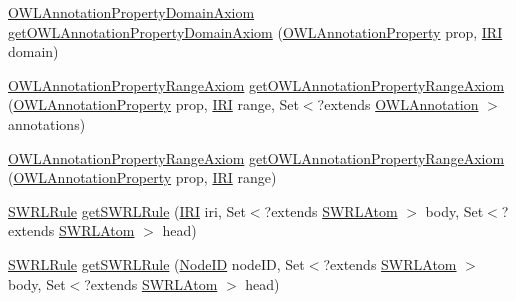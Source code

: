 \begin{DoxyCompactItemize}
\item 
\hyperlink{interfaceorg_1_1semanticweb_1_1owlapi_1_1model_1_1_o_w_l_annotation_property_domain_axiom}{O\-W\-L\-Annotation\-Property\-Domain\-Axiom} \hyperlink{classuk_1_1ac_1_1manchester_1_1cs_1_1owl_1_1owlapi_1_1_o_w_l_data_factory_impl_a42e56036485aa89a8f03d51d52663714}{get\-O\-W\-L\-Annotation\-Property\-Domain\-Axiom} (\hyperlink{interfaceorg_1_1semanticweb_1_1owlapi_1_1model_1_1_o_w_l_annotation_property}{O\-W\-L\-Annotation\-Property} prop, \hyperlink{classorg_1_1semanticweb_1_1owlapi_1_1model_1_1_i_r_i}{I\-R\-I} domain)
\item 
\hyperlink{interfaceorg_1_1semanticweb_1_1owlapi_1_1model_1_1_o_w_l_annotation_property_range_axiom}{O\-W\-L\-Annotation\-Property\-Range\-Axiom} \hyperlink{classuk_1_1ac_1_1manchester_1_1cs_1_1owl_1_1owlapi_1_1_o_w_l_data_factory_impl_a6e60beb4b0b4d50bc9dab99e5c59f611}{get\-O\-W\-L\-Annotation\-Property\-Range\-Axiom} (\hyperlink{interfaceorg_1_1semanticweb_1_1owlapi_1_1model_1_1_o_w_l_annotation_property}{O\-W\-L\-Annotation\-Property} prop, \hyperlink{classorg_1_1semanticweb_1_1owlapi_1_1model_1_1_i_r_i}{I\-R\-I} range, Set$<$?extends \hyperlink{interfaceorg_1_1semanticweb_1_1owlapi_1_1model_1_1_o_w_l_annotation}{O\-W\-L\-Annotation} $>$ annotations)
\item 
\hyperlink{interfaceorg_1_1semanticweb_1_1owlapi_1_1model_1_1_o_w_l_annotation_property_range_axiom}{O\-W\-L\-Annotation\-Property\-Range\-Axiom} \hyperlink{classuk_1_1ac_1_1manchester_1_1cs_1_1owl_1_1owlapi_1_1_o_w_l_data_factory_impl_a4371da7aa2710c6983bc51aeda62dab2}{get\-O\-W\-L\-Annotation\-Property\-Range\-Axiom} (\hyperlink{interfaceorg_1_1semanticweb_1_1owlapi_1_1model_1_1_o_w_l_annotation_property}{O\-W\-L\-Annotation\-Property} prop, \hyperlink{classorg_1_1semanticweb_1_1owlapi_1_1model_1_1_i_r_i}{I\-R\-I} range)
\item 
\hyperlink{interfaceorg_1_1semanticweb_1_1owlapi_1_1model_1_1_s_w_r_l_rule}{S\-W\-R\-L\-Rule} \hyperlink{classuk_1_1ac_1_1manchester_1_1cs_1_1owl_1_1owlapi_1_1_o_w_l_data_factory_impl_aabd296864fd7ff30d4425c1039f25e6c}{get\-S\-W\-R\-L\-Rule} (\hyperlink{classorg_1_1semanticweb_1_1owlapi_1_1model_1_1_i_r_i}{I\-R\-I} iri, Set$<$?extends \hyperlink{interfaceorg_1_1semanticweb_1_1owlapi_1_1model_1_1_s_w_r_l_atom}{S\-W\-R\-L\-Atom} $>$ body, Set$<$?extends \hyperlink{interfaceorg_1_1semanticweb_1_1owlapi_1_1model_1_1_s_w_r_l_atom}{S\-W\-R\-L\-Atom} $>$ head)
\item 
\hyperlink{interfaceorg_1_1semanticweb_1_1owlapi_1_1model_1_1_s_w_r_l_rule}{S\-W\-R\-L\-Rule} \hyperlink{classuk_1_1ac_1_1manchester_1_1cs_1_1owl_1_1owlapi_1_1_o_w_l_data_factory_impl_a226db4b6ceba4b5367fcbc138e9a37a4}{get\-S\-W\-R\-L\-Rule} (\hyperlink{classorg_1_1semanticweb_1_1owlapi_1_1model_1_1_node_i_d}{Node\-I\-D} node\-I\-D, Set$<$?extends \hyperlink{interfaceorg_1_1semanticweb_1_1owlapi_1_1model_1_1_s_w_r_l_atom}{S\-W\-R\-L\-Atom} $>$ body, Set$<$?extends \hyperlink{interfaceorg_1_1semanticweb_1_1owlapi_1_1model_1_1_s_w_r_l_atom}{S\-W\-R\-L\-Atom} $>$ head)

\end{DoxyCompactItemize}
